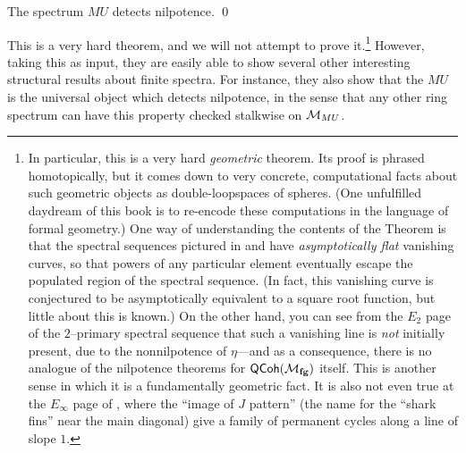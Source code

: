 \begin{theorem}\label{DevinatzHopkinsSmith}
The spectrum $MU$ detects nilpotence. \qed
\end{theorem}

\noindent This is a very hard theorem, and we will not attempt to prove it.\footnote{In particular, this is a very hard \emph{geometric} theorem.  Its proof is phrased homotopically, but it comes down to very concrete, computational facts about such geometric objects as double-loopspaces of spheres.  (One unfulfilled daydream of this book is to re-encode these computations in the language of formal geometry.)  One way of understanding the contents of the Theorem is that the spectral sequences pictured in  and  have \emph{asymptotically flat} vanishing curves, so that powers of any particular element eventually escape the populated region of the spectral sequence.  (In fact, this vanishing curve is conjectured to be asymptotically equivalent to a square root function, but little about this is known.)  On the other hand, you can see from the $E_2$ page of the $2$--primary spectral sequence that such a vanishing line is \emph{not} initially present, due to the nonnilpotence of $\eta$---and as a consequence, there is no analogue of the nilpotence theorems for $\mathsf{QCoh}(\mathcal{M}_{\mathbf{fg}})$ itself.  This is another sense in which it is a fundamentally geometric fact.  It is also not even true at the $E_\infty$ page of , where the ``image of $J$ pattern'' (the name for the ``shark fins'' near the main diagonal) give a family of permanent cycles along a line of slope $1$.}
However, taking this as input, they are easily able to show several other interesting structural results about finite spectra.  For instance, they also show that the $MU$ is the universal object which detects nilpotence, in the sense that any other ring spectrum can have this property checked stalkwise on $\mathcal{M}_{MU}$.

